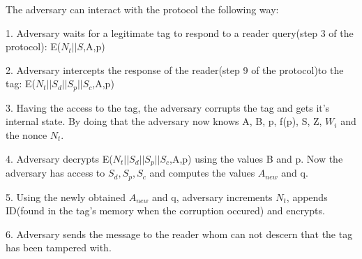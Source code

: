     The adversary can interact with the protocol the following way:

    1. Adversary waits for a legitimate tag to respond to a reader query(step 3 of the protocol): E($N_t||S$,A,p)
    
    2. Adversary intercepts the response of the reader(step 9 of the protocol)to the tag: E($N_t||S_d||S_p||S_c$,A,p)
    
    3. Having the access to the tag, the adversary corrupts the tag and gets it's internal state. By doing that the adversary now knows A, B, p, f(p), S, Z, $W_i$ and the nonce $N_t$.
    
    4. Adversary decrypts E($N_t||S_d||S_p||S_c$,A,p) using the values B and p. Now the adversary has access to $S_d, S_p, S_c$ and computes the values $A_{new}$ and q.
    
    5. Using the newly obtained $A_{new}$ and q, adversary increments $N_t$, appends ID(found in the tag's memory when the corruption occured) and encrypts.
    
    6. Adversary sends the message to the reader whom can not descern that the tag has been tampered with.

